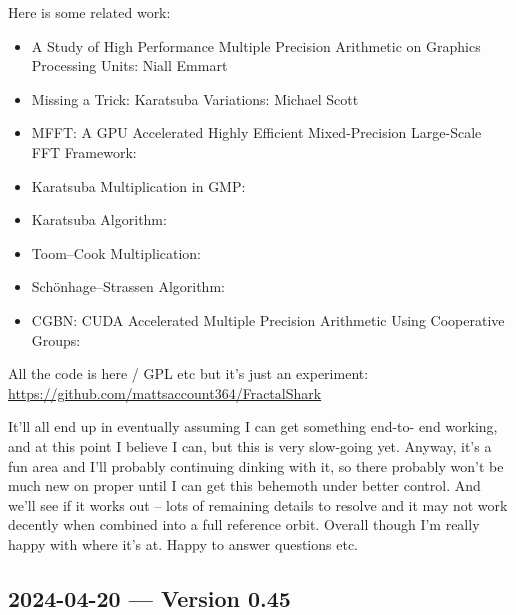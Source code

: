 Here is some related work:

\begin{itemize}

\item A Study of High Performance Multiple Precision Arithmetic on Graphics 
Processing Units: Niall Emmart \cite{Emmart_GPU_MultiPrecision}

\item Missing a Trick: Karatsuba Variations: Michael Scott \cite{Scott_Karatsuba_MissingTrick}

\item MFFT: A GPU Accelerated Highly Efficient Mixed-Precision Large-Scale FFT 
Framework: \cite{MFFT_GPU_FFT}

\item Karatsuba Multiplication in GMP: \cite{GMP_Karatsuba}

\item Karatsuba Algorithm: \cite{Karatsuba_Wikipedia}

\item Toom--Cook Multiplication: \cite{ToomCook_Wikipedia}

\item Sch{\"o}nhage--Strassen Algorithm: \cite{SchonhageStrassen_Wikipedia}

\item CGBN: CUDA Accelerated Multiple Precision Arithmetic Using Cooperative 
Groups: \cite{CGBN_NVlabs}

\end{itemize}

All the code is here / GPL etc but it's just an experiment: \\
\url{https://github.com/mattsaccount364/FractalShark}

It'll all end up in \FractalShark{} eventually assuming I can get something end-to-
end working, and at this point I believe I can, but this is very slow-going 
yet.  Anyway, it's a fun area and I'll probably continuing dinking with it, so 
there probably won't be much new on \FractalShark{} proper until I can get this 
behemoth under better control.  And we'll see if it works out -- lots of 
remaining details to resolve and it may not work decently when combined into a 
full reference orbit.  Overall though I'm really happy with where it's at.  
Happy to answer questions etc.

\subsection{2024-04-20 --- Version 0.45}

